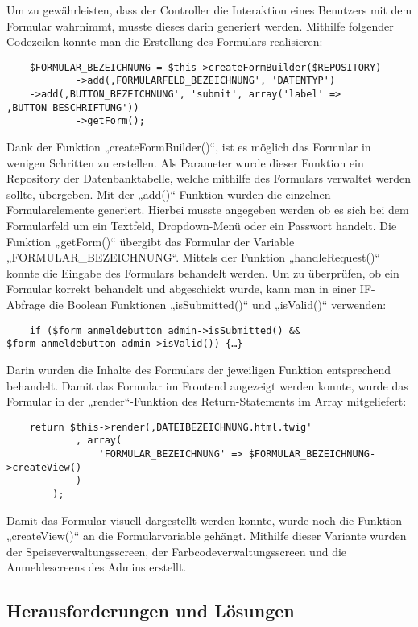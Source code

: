 	Um zu gewährleisten, dass der Controller die Interaktion eines Benutzers mit dem Formular wahrnimmt, musste dieses darin generiert werden. Mithilfe folgender Codezeilen konnte man die Erstellung des Formulars realisieren:
	\lstset{language = php}
  	\begin{lstlisting}
  	$FORMULAR_BEZEICHNUNG = $this->createFormBuilder($REPOSITORY)
            ->add(‚FORMULARFELD_BEZEICHNUNG', 'DATENTYP')
	->add(‚BUTTON_BEZEICHNUNG', 'submit', array('label' => ‚BUTTON_BESCHRIFTUNG'))
            ->getForm();
  	\end{lstlisting}
	Dank der Funktion „createFormBuilder()“, ist es möglich das Formular in wenigen Schritten zu erstellen. Als Parameter wurde dieser Funktion ein Repository der Datenbanktabelle, welche mithilfe des Formulars verwaltet werden sollte, übergeben. Mit der „add()“ Funktion wurden die einzelnen Formularelemente generiert. Hierbei musste angegeben werden ob es sich bei dem Formularfeld um ein Textfeld, Dropdown-Menü oder ein Passwort handelt. Die Funktion „getForm()“ übergibt das Formular der Variable „FORMULAR\_BEZEICHNUNG“.
	Mittels der Funktion „handleRequest()“ konnte die Eingabe des Formulars behandelt werden. Um zu überprüfen, ob ein Formular korrekt behandelt und abgeschickt wurde, kann man in einer IF-Abfrage die Boolean Funktionen „isSubmitted()“ und „isValid()“ verwenden:
	\lstset{language = php}
  	\begin{lstlisting}
  	if ($form_anmeldebutton_admin->isSubmitted() && $form_anmeldebutton_admin->isValid()) {…}
  	\end{lstlisting}
	Darin wurden die Inhalte des Formulars der jeweiligen Funktion entsprechend behandelt.
	Damit das Formular im Frontend angezeigt werden konnte, wurde das Formular in der „render“-Funktion des Return-Statements im Array mitgeliefert:
	\lstset{language = php}
  	\begin{lstlisting}
  	return $this->render(‚DATEIBEZEICHNUNG.html.twig'
            , array(
                'FORMULAR_BEZEICHNUNG' => $FORMULAR_BEZEICHNUNG->createView()
            )
        );
  	\end{lstlisting}
	Damit das Formular visuell dargestellt werden konnte, wurde noch die Funktion „createView()“ an die Formularvariable gehängt.
	Mithilfe dieser Variante wurden der Speiseverwaltungsscreen, der Farbcodeverwaltungsscreen und die Anmeldescreens des Admins erstellt.

  \subsection{Herausforderungen und Lösungen}

